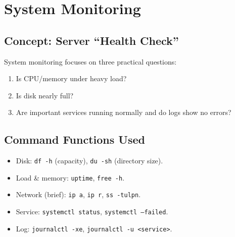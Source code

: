 \section{System Monitoring}
\label{sec:system-monitoring}

\subsection*{Concept: Server ``Health Check''}
System monitoring focuses on three practical questions:
\begin{enumerate}
    \item Is CPU/memory under heavy load?
    \item Is disk nearly full?
    \item Are important services running normally and do logs show no errors?
\end{enumerate}

\subsection*{Command Functions Used}
\begin{itemize}
    \item Disk: \texttt{df -h} (capacity), \texttt{du -sh} (directory size).
    \item Load \& memory: \texttt{uptime}, \texttt{free -h}.
    \item Network (brief): \texttt{ip a}, \texttt{ip r}, \texttt{ss -tulpn}.
    \item Service: \texttt{systemctl status}, \texttt{systemctl --failed}.
    \item Log: \texttt{journalctl -xe}, \texttt{journalctl -u <service>}.
\end{itemize}


